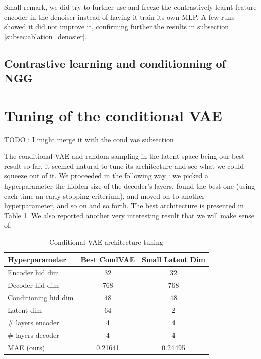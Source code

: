 \documentclass[10pt,twocolumn,letterpaper]{article}
\begin{document}
\noindent
Small remark, we did try to further use and freeze the contrastively learnt feature encoder in the denoiser instead of having it train its own MLP. A few runs showed it did not improve it, confirming further the results in subsection \ref{subsec:ablation_denosier}.



\subsection{Contrastive learning and conditionning of NGG}
\label{subsec:CLIP_cond}

\section{Tuning of the conditional VAE}
\label{sec:setup}
TODO : I might merge it with the cond vae subsection

The conditional VAE and random sampling in the latent space being our best result so far, it seemed natural to tune its architecture and see what we could squeeze out of it. We proceeded in the following way : we picked a hyperparameter \eg the hidden size of the decoder's layers, found the best one (using each time an early stopping criterium), and moved on to another hyperparameter, and so on and so forth. The best architecture is presented in Table \ref{tab:condvae_arch}. We also reported another very interesting result that we will make sense of.

\begin{table}[h!]
    \centering
    \small  %
    \renewcommand{\arraystretch}{1.2}  %
    \begin{tabular}{|l|c|c|}  %
        \hline
        \textbf{Hyperparameter} & \textbf{Best CondVAE} & \textbf{Small Latent Dim} \\
        \hline
        Encoder hid dim & 32 & 32 \\
        Decoder hid dim & 768 & 768 \\
        Conditioning hid dim & 48 & 48 \\
        Latent dim & 64 & 2 \\
        \# layers encoder & 4 & 4 \\
        \# layers decoder & 4 & 4 \\
        \hline
        MAE (ours) & 0.21641 & 0.24495 \\
        \hline
    \end{tabular}
    \caption{Conditional VAE architecture tuning}
    \label{tab:condvae_arch}
\end{table}
\end{document}
